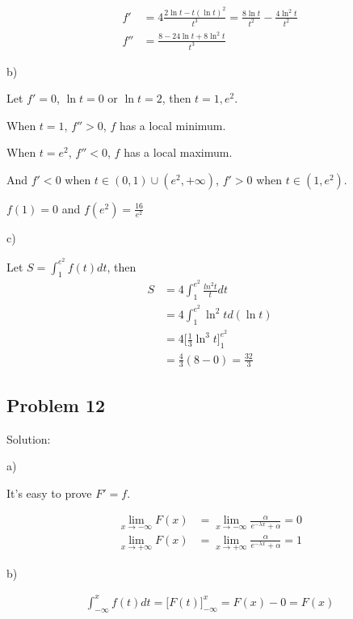 \documentclass[letterpaper, 11pt]{article}
\newcommand{\1}{\mathds{1}}	%
\theoremstyle{definition}
\begin{document}
\begin{align*}
  f' &= 4 \frac{2 \ln t - t (\ln t) ^{2}}{t ^{3}} = \frac{8 \ln t}{t ^{2}} - \frac{4 \ln ^{2} t}{t ^{2}} \\
  f'' &= \frac{8 - 24 \ln t + 8 \ln ^{2} t}{t ^{3}} 
\end{align*}

b)

Let $f' = 0$, $\ln t = 0$ or $\ln t = 2$, then $t = 1, e ^{2}$.

When $ t = 1$, $f'' > 0$, $f$ has a local minimum.

When $ t = e ^{2}$, $f '' < 0$, $f$ has a local maximum.

And $f' < 0$ when $t \in (0, 1) \cup (e ^{2}, +\infty)$, $f' > 0$ when $t \in (1, e ^{2})$.

$f(1) = 0$ and $f(e ^{2}) = \frac{16}{e ^{2}}$


c)

Let $S = \int_{1}^{e ^{2}} f(t)dt$, then 
\begin{align*}
  S &= 4\int_{1}^{e ^{2}} \frac{ln ^{2} t}{t} dt \\
  &= 4 \int_{1}^{e ^{2}} \ln ^{2} t d(\ln t) \\
  &= 4 \Big[ \frac{1}{3} \ln ^{3} t \Big]_{1}^{e ^{2}} \\
  &= \frac{4}{3}(8 - 0) = \frac{32}{3}
\end{align*}


\subsection*{Problem 12}

Solution:

a)

It's easy to prove $F' = f$.

\begin{align*}
  \lim_{x \to -\infty} F(x) &= \lim_{x \to -\infty} \frac{\alpha}{e ^{- \lambda x} + \alpha} = 0 \\
  \lim_{x \to +\infty} F(x) &=\lim_{x \to +\infty} \frac{\alpha}{e ^{- \lambda x} + \alpha} = 1
\end{align*}

b)

\begin{align*}
  \int_{-\infty }^{x} f(t) dt = \Big[ F(t) \Big]_{- \infty }^{x} = F(x) -0 = F(x) \\
\end{align*}
\end{document}
